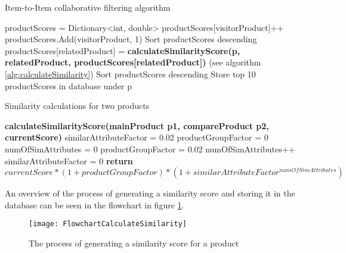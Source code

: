 \begin{algorithm}[H]
\caption{Item-to-Item collaborative filtering algorithm}
\label{alg:collaborativeFilter}
\begin{algorithmic}[1]
\State productScores = Dictionary<int, double>
\State productScores[visitorProduct]++
\Else
\State productScores.Add(visitorProduct, 1)
\EndIf
\EndFor
\EndFor
\State Sort productScores descending
\State productScores[relatedProduct] =
\State \textbf{calculateSimilarityScore(p, relatedProduct, productScores[relatedProduct])} (see algorithm \ref{alg:calculateSimilarity})
\EndFor
\State Sort productScores descending
\State Store top 10 productScores in database under p
\EndFor
\end{algorithmic}
\end{algorithm}

\begin{algorithm}[H]
\caption{Similarity calculations for two products }
\label{alg:calculateSimilarity}
\begin{algorithmic}[1]

\State \textbf{calculateSimilarityScore(mainProduct p1, compareProduct p2, currentScore)}
\State similarAttributeFactor = 0.02
\State productGroupFactor = 0
\State numOfSimAttributes = 0
\State productGroupFactor = 0.02
\EndIf
{}
\State numOfSimAttributes++
\EndIf
\EndFor
{}
\State similarAttributeFactor = 0
\EndIf
\State \textbf{return} \begin{math} currentScore * (1+productGroupFactor)*(1+similarAttributeFactor^{numOfSimAttributes}) \end{math}
\end{algorithmic}
\end{algorithm}

An overview of the process of generating a similarity score and storing it in the database can be seen in the flowchart in figure \ref{flowChartSimilarity}.

\begin{figure}[H]
\centering
\texttt{[image: FlowchartCalculateSimilarity]}
\caption{The process of generating a similarity score for a product}
\label{flowChartSimilarity}
\end{figure}

